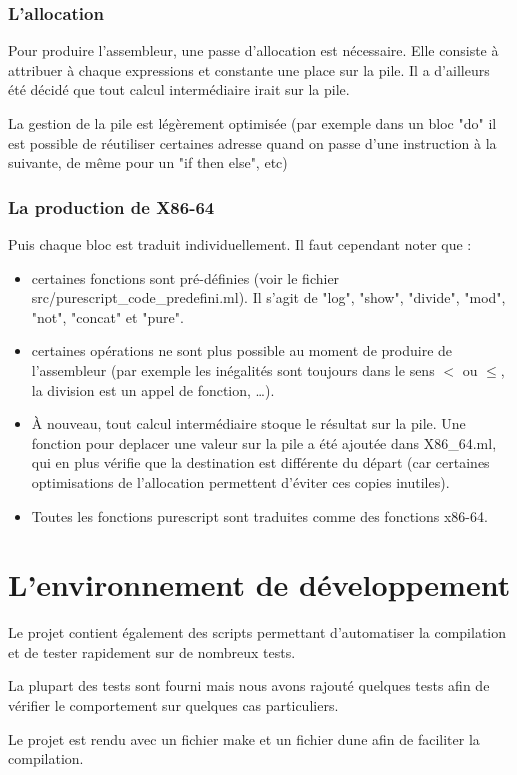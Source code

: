 \documentclass[12pt,a4paper,french]{article}
\begin{document}
\section*{L'allocation}
Pour produire l'assembleur, une passe d'allocation est nécessaire. Elle consiste à attribuer à chaque expressions et constante une place sur la pile. Il a d'ailleurs été décidé que tout calcul intermédiaire irait sur la pile.

La gestion de la pile est légèrement optimisée (par exemple dans un bloc "do" il est possible de réutiliser certaines adresse quand on passe d'une instruction à la suivante, de même pour un "if then else", etc)


\section*{La production de X86-64}
\noindent Puis chaque bloc est traduit individuellement. Il faut cependant noter que :
\begin{itemize}
    \item certaines fonctions sont pré-définies (voir le fichier src/purescript\_code\_predefini.ml). Il s'agit de "log", "show", "divide", "mod", "not", "concat" et "pure".
    \item certaines opérations ne sont plus possible au moment de produire de l'assembleur (par exemple les inégalités sont toujours dans le sens $<$ ou $\le$, la division est un appel de fonction, \dots).
    \item À nouveau, tout calcul intermédiaire stoque le résultat sur la pile. Une fonction pour deplacer une valeur sur la pile a été ajoutée dans X86\_64.ml, qui en plus vérifie que la destination est différente du départ (car certaines optimisations de l'allocation permettent d'éviter ces copies inutiles).
    \item Toutes les fonctions purescript sont traduites comme des fonctions x86-64.
\end{itemize}


\newpage
\part*{L'environnement de développement}
Le projet contient également des scripts permettant d'automatiser la compilation et de tester rapidement sur de nombreux tests.

La plupart des tests sont fourni mais nous avons rajouté quelques tests afin de vérifier le comportement sur quelques cas particuliers.

Le projet est rendu avec un fichier make et un fichier dune afin de faciliter la compilation.
\end{document}
